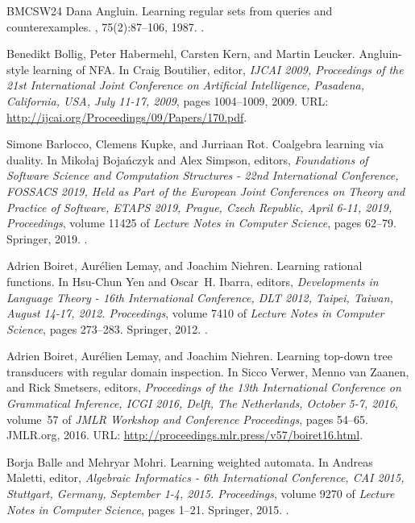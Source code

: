 \documentclass[10pt,a4paper]{amsart}
\theoremstyle{definition}
\numberwithin{equation}{section}
\numberwithin{theorem}{section}
\begin{document}
\begin{thebibliography}{BMCSW24}
Dana Angluin.
\newblock Learning regular sets from queries and counterexamples.
, 75(2):87--106, 1987.
\newblock \href {https://doi.org/10.1016/0890-5401(87)90052-6}
  {}.

Benedikt Bollig, Peter Habermehl, Carsten Kern, and Martin Leucker.
\newblock Angluin-style learning of {NFA}.
\newblock In Craig Boutilier, editor, {\em {IJCAI} 2009, Proceedings of the
  21st International Joint Conference on Artificial Intelligence, Pasadena,
  California, USA, July 11-17, 2009}, pages 1004--1009, 2009.
\newblock URL: \url{http://ijcai.org/Proceedings/09/Papers/170.pdf}.

Simone Barlocco, Clemens Kupke, and Jurriaan Rot.
\newblock Coalgebra learning via duality.
\newblock In Miko{\l}aj Boja{\'{n}}czyk and Alex Simpson, editors, {\em
  Foundations of Software Science and Computation Structures - 22nd
  International Conference, {FOSSACS} 2019, Held as Part of the European Joint
  Conferences on Theory and Practice of Software, {ETAPS} 2019, Prague, Czech
  Republic, April 6-11, 2019, Proceedings}, volume 11425 of {\em Lecture Notes
  in Computer Science}, pages 62--79. Springer, 2019.
\newblock \href {https://doi.org/10.1007/978-3-030-17127-8_4}
  {}.

Adrien Boiret, Aur{\'{e}}lien Lemay, and Joachim Niehren.
\newblock Learning rational functions.
\newblock In Hsu{-}Chun Yen and Oscar~H. Ibarra, editors, {\em Developments in
  Language Theory - 16th International Conference, {DLT} 2012, Taipei, Taiwan,
  August 14-17, 2012. Proceedings}, volume 7410 of {\em Lecture Notes in
  Computer Science}, pages 273--283. Springer, 2012.
\newblock \href {https://doi.org/10.1007/978-3-642-31653-1\_25}
  {}.

Adrien Boiret, Aur{\'{e}}lien Lemay, and Joachim Niehren.
\newblock Learning top-down tree transducers with regular domain inspection.
\newblock In Sicco Verwer, Menno van Zaanen, and Rick Smetsers, editors, {\em
  Proceedings of the 13th International Conference on Grammatical Inference,
  {ICGI} 2016, Delft, The Netherlands, October 5-7, 2016}, volume~57 of {\em
  {JMLR} Workshop and Conference Proceedings}, pages 54--65. JMLR.org, 2016.
\newblock URL: \url{http://proceedings.mlr.press/v57/boiret16.html}.

Borja Balle and Mehryar Mohri.
\newblock Learning weighted automata.
\newblock In Andreas Maletti, editor, {\em Algebraic Informatics - 6th
  International Conference, {CAI} 2015, Stuttgart, Germany, September 1-4,
  2015. Proceedings}, volume 9270 of {\em Lecture Notes in Computer Science},
  pages 1--21. Springer, 2015.
\newblock \href {https://doi.org/10.1007/978-3-319-23021-4\_1}
  {}.


\end{thebibliography}
\end{document}
